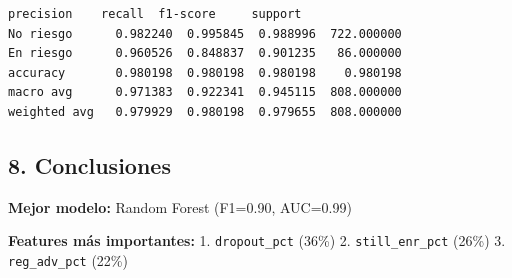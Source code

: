 \documentclass[11pt]{article}
\makeatletter
\newcommand{\boxspacing}{\kern\kvtcb@left@rule\kern\kvtcb@boxsep}
\newcommand{\prompt}[4]{
        {\ttfamily\llap{{\color{#2}[#3]:\hspace{3pt}#4}}\vspace{-\baselineskip}}
    }
\makeatother
\begin{document}
            \begin{tcolorbox}[breakable, size=fbox, boxrule=.5pt, pad at break*=1mm, opacityfill=0]
\prompt{Out}{outcolor}{75}{\boxspacing}
\begin{Verbatim}[commandchars=\\\{\}]
              precision    recall  f1-score     support
No riesgo      0.982240  0.995845  0.988996  722.000000
En riesgo      0.960526  0.848837  0.901235   86.000000
accuracy       0.980198  0.980198  0.980198    0.980198
macro avg      0.971383  0.922341  0.945115  808.000000
weighted avg   0.979929  0.980198  0.979655  808.000000
\end{Verbatim}
\end{tcolorbox}
        
    \subsection{8. Conclusiones}\label{conclusiones}

\textbf{Mejor modelo:} Random Forest (F1=0.90, AUC=0.99)

\textbf{Features más importantes:} 1. \texttt{dropout\_pct} (36\%) 2.
\texttt{still\_enr\_pct} (26\%) 3. \texttt{reg\_adv\_pct} (22\%)


    
    
    
\end{document}
